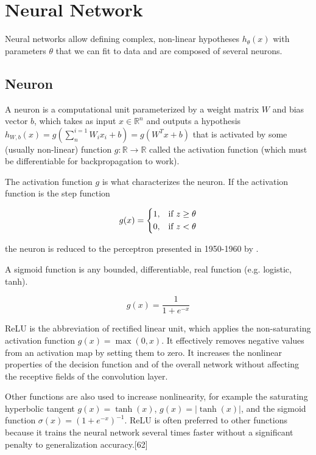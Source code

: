 \section{Neural Network}

Neural networks allow defining complex, non-linear hypotheses $h_\theta(x)$ with parameters $\theta$ that we can fit to data and are composed of several neurons.

\subsection{Neuron}

A neuron is a computational unit parameterized by a weight matrix $W$ and bias vector $b$, which takes as input $x \in \mathbb{R}^{n}$ and outputs a hypothesis $h_{W,b}(x) = g(\sum^{i=1}_{n} W_{i}x_{i} + b) = g(W^Tx + b)$ that is activated by some (usually non-linear) function $g \colon \mathbb{R} \to \mathbb{R}$ called the activation function (which must be differentiable for backpropagation to work).

The activation function $g$ is what characterizes the neuron. If the activation function is the step function

$$
g(x) =
\begin{dcases}
    1,& \text{if } z \geq \theta\\
    0,& \text{if } z < \theta
\end{dcases}
$$

the neuron is reduced to the perceptron presented in 1950-1960 by \citeauthor{perceptron} \cite{perceptron}.

A sigmoid function is any bounded, differentiable, real function (e.g. logistic, tanh).

$$
g(x) = \frac{1}{1 + e^{-x}}
$$

ReLU is the abbreviation of rectified linear unit, which applies the non-saturating activation function $g(x)=\max(0,x)$. It effectively removes negative values from an activation map by setting them to zero. It increases the nonlinear properties of the decision function and of the overall network without affecting the receptive fields of the convolution layer.

Other functions are also used to increase nonlinearity, for example the saturating hyperbolic tangent $g(x)=\tanh(x)$, $g(x)=|\tanh(x)|$, and the sigmoid function $\sigma (x)=(1+e^{-x})^{-1}$. ReLU is often preferred to other functions because it trains the neural network several times faster without a significant penalty to generalization accuracy.[62]

